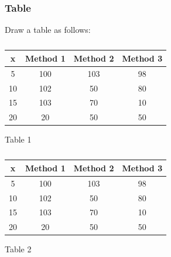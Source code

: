 \documentclass[preprint,11pt]{elsarticle}
\begin{document}
	\subsubsection{Table}
	Draw a table as follows:
	\begin{table}[h]
		\begin{subtable}{0.55\textwidth}
			\centering
			\begin{tabular}[h!]{|c|c|c|c|}
				\hline
				x & Method 1 & Method 2 & Method 3 \\
				\hline
				5 & 100 & 103 & 98  \\
				\hline
				10 & 102 & 50 & 80  \\
				\hline
				15 & 103 & 70 & 10  \\
				\hline
				20 & 20 & 50 & 50  \\
				\hline
			\end{tabular}
			\captionsetup{justification=centering}
			\caption{Table 1}
			\label{tab:table1_a}
		\end{subtable}%
		\hspace{\fill}
		\begin{subtable}{0.55\textwidth}
			\centering
			\begin{tabular}[h!]{|c|c|c|c|}
				\hline
				x & Method 1 & Method 2 & Method 3 \\
				\hline
				5 & 100 & 103 & 98  \\
				\hline
				10 & 102 & 50 & 80  \\
				\hline
				15 & 103 & 70 & 10  \\
				\hline
				20 & 20 & 50 & 50  \\
				\hline
			\end{tabular}
			
			\caption{Table 2}
			\label{tab:table1_a}
		\end{subtable}%
		\caption{}
	\end{table}
\end{document}
